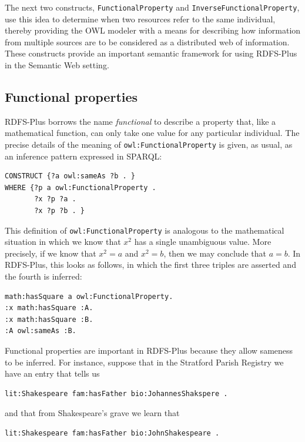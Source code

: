 The next two constructs, \texttt{FunctionalProperty} and
\texttt{InverseFunctionalProperty}, use this idea to determine when two resources
refer to the same individual, thereby providing the OWL modeler with a
means for describing how information from multiple sources are to be
considered as a distributed web of information. These constructs provide
an important semantic framework for using RDFS-Plus in the Semantic Web
setting.

\subsection{Functional properties}

RDFS-Plus borrows the name \emph{functional} to describe a property that, like
a mathematical function, can only take one value for any particular
individual. The precise details of the meaning of \texttt{owl:FunctionalProperty}
is given, as usual, as an inference pattern expressed in SPARQL:

\begin{lstlisting}
CONSTRUCT {?a owl:sameAs ?b . }
WHERE {?p a owl:FunctionalProperty .
       ?x ?p ?a .
       ?x ?p ?b . }
\end{lstlisting}

This definition of \texttt{owl:FunctionalProperty} is analogous to the
mathematical situation in which we know that $x^2$ has a single unambiguous
value. More precisely, if we know that $x^2 = a$ and $x^2 = b$, then we may
conclude that $a = b$. In RDFS-Plus, this looks as follows, in which the
first three triples are asserted and the fourth is inferred:

\begin{lstlisting}
math:hasSquare a owl:FunctionalProperty.
:x math:hasSquare :A.
:x math:hasSquare :B.
:A owl:sameAs :B.
\end{lstlisting}

Functional properties are important in RDFS-Plus because they allow
sameness to be inferred. For instance, suppose that in the Stratford
Parish Registry we have an entry that tells us

\begin{lstlisting}
lit:Shakespeare fam:hasFather bio:JohannesShakspere .
\end{lstlisting}

and that from Shakespeare's grave we learn that

\begin{lstlisting}
lit:Shakespeare fam:hasFather bio:JohnShakespeare .
\end{lstlisting}

